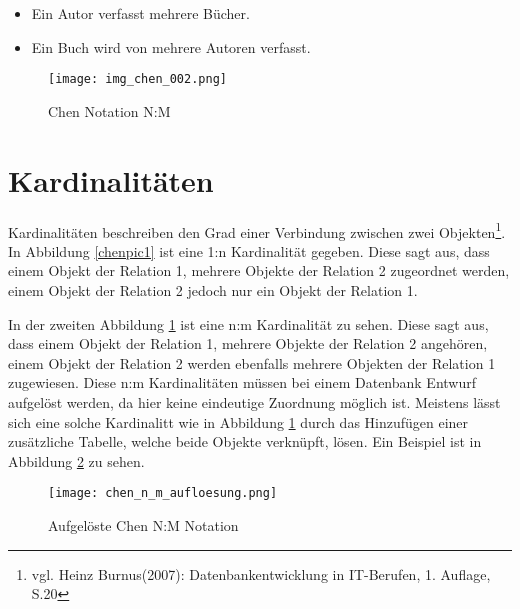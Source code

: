 \begin{itemize}
\item Ein Autor verfasst mehrere Bücher.
\item Ein Buch wird von mehrere Autoren verfasst.
\end{itemize}

\begin{figure}[H]
\begin{center}
\texttt{[image: img\_chen\_002.png]}
\caption{Chen Notation N:M}
\label{chenpic2}
\end{center}
\end{figure}

\section{Kardinalitäten}

Kardinalitäten beschreiben den Grad einer Verbindung zwischen zwei Objekten\footnote{vgl. Heinz Burnus(2007): Datenbankentwicklung in IT-Berufen, 1. Auflage, S.20}.
In Abbildung \ref{chenpic1} ist eine 1:n Kardinalität gegeben.
Diese sagt aus, dass einem Objekt der Relation 1, mehrere Objekte der Relation 2 zugeordnet werden, einem Objekt der Relation 2 jedoch nur ein Objekt der Relation 1.

In der zweiten Abbildung \ref{chenpic2} ist eine n:m Kardinalität zu sehen.
Diese sagt aus, dass einem Objekt der Relation 1, mehrere Objekte der Relation 2 angehören, einem Objekt der Relation 2 werden ebenfalls mehrere Objekten der Relation 1 zugewiesen.
Diese n:m Kardinalitäten müssen bei einem Datenbank Entwurf aufgelöst werden, da hier keine eindeutige Zuordnung möglich ist. Meistens lässt sich eine solche Kardinalitt wie in Abbildung \ref{chenpic2} durch das Hinzufügen einer zusätzliche Tabelle, welche beide Objekte verknüpft, lösen.
Ein Beispiel ist in Abbildung \ref{chenpic3} zu sehen.

\begin{figure}[H]
\begin{center}
\texttt{[image: chen\_n\_m\_aufloesung.png]}
\caption{Aufgelöste Chen N:M Notation}
\label{chenpic3}
\end{center}
\end{figure}

